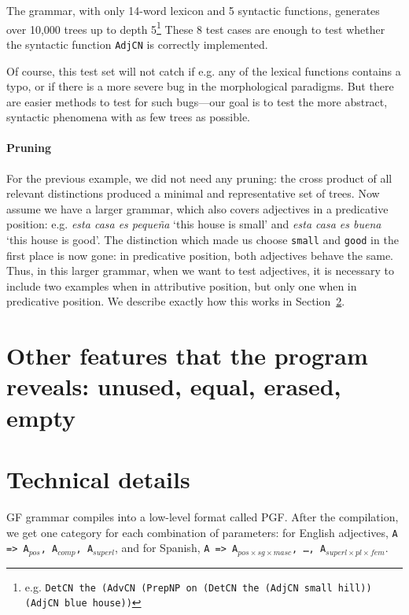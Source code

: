 \documentclass[11pt]{article}
\def\t#1{\texttt{#1}}
\begin{document}
The grammar, with only 14-word lexicon and 5 syntactic functions,
generates over 10,000 %
trees up to depth 5\footnote{e.g. {\tt DetCN the (AdvCN (PrepNP on (DetCN
    the (AdjCN small hill)) (AdjCN blue house))}}
These 8 test cases are enough to test whether the
syntactic function \t{AdjCN} is correctly implemented.   

Of course, this test set will not catch if e.g. any of the lexical
functions contains a typo, or if there is a more severe bug in the
morphological paradigms. But there are easier methods to test for such
bugs---our goal is to test the more abstract, syntactic phenomena with
as few trees as possible. 


\paragraph{Pruning}

For the previous example, we did not need any pruning: the cross
product of all relevant distinctions produced a minimal and
representative set of trees. Now assume we have a larger grammar,
which also covers adjectives in a predicative position:
e.g. \emph{esta casa es peque\~{n}a} `this house is small' and
\emph{esta casa es buena} `this house is good'. The distinction which
made us choose \t{small} and \t{good} in the first place is now gone:
in predicative position, both adjectives behave the same. Thus, in
this larger grammar, when we want to test adjectives, it is necessary
to include two examples when in attributive position, but only one
when in predicative position. We describe exactly how this works in
Section~\ref{sec:details}. 


\section{Other features that the program reveals: unused, equal,
  erased, empty}



\section{Technical details}
\label{sec:details}

GF grammar compiles into a low-level format called PGF. After the
compilation, we get one category for each combination of parameters:
for English adjectives, \texttt{A => A$_{pos}$, A$_{comp}$,
A$_{superl}$}, and for Spanish, \texttt{A => A$_{pos×sg×masc}$, \dots,
A$_{superl×pl×fem}$}. 
\end{document}
